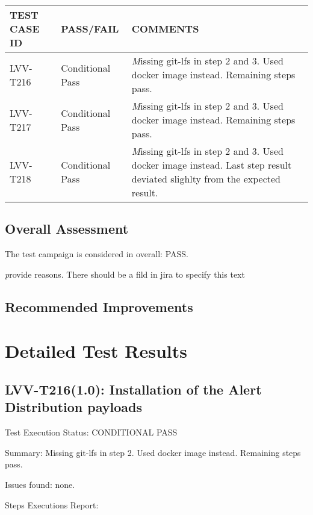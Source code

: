 \documentclass[DM,lsstdraft,STR,toc]{lsstdoc}
\begin{document}
\begin{longtable} {|p{}|p{}|p{}|}\hline
{\bf TEST CASE ID} & {\bf PASS/FAIL} & {\bf COMMENTS} \\\hline
LVV-T216 & Conditional Pass & {\textit Missing git-lfs in step 2 and 3. Used docker image instead. Remaining steps pass.} \\\hline
LVV-T217 & Conditional Pass & {\textit Missing git-lfs in step 2 and 3. Used docker image instead. Remaining steps pass.} \\\hline
LVV-T218 & Conditional Pass & {\textit Missing git-lfs in step 2 and 3. Used docker image instead. Last step result deviated slighlty from the expected result.} \\\hline
\end{longtable}

\subsection{Overall Assessment}
\label{sect:overallassessment}

The test campaign is considered in overall: PASS.

{\textit provide reasons. There should be a fild in jira to specify this text}


\subsection{Recommended Improvements}
\label{sect:recommendations}




\newpage

\section{Detailed Test Results}
\label{sect:detailed}


\subsection{LVV-T216(1.0): Installation of the Alert Distribution payloads}
\label{sect:detail-lvv-t216}

Test Execution Status: CONDITIONAL PASS

Summary: Missing git-lfs in step 2. Used docker image instead. Remaining steps pass.

Issues found: none.

Steps Executions Report:
\end{document}
